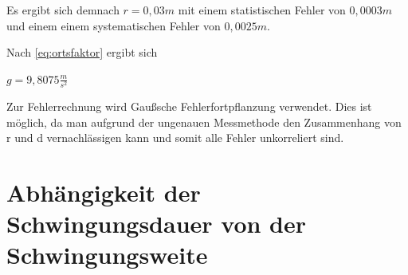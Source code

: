 Es ergibt sich demnach $r = 0,03m$ mit einem statistischen Fehler von $0,0003m$ und einem einem systematischen Fehler von $0,0025m$.

Nach \ref{eq:ortsfaktor} ergibt sich

$g = 9,8075\frac{m}{s^2}$

Zur Fehlerrechnung wird Gaußsche Fehlerfortpflanzung verwendet. Dies ist möglich, da man aufgrund der ungenauen Messmethode den Zusammenhang von r und d vernachlässigen kann und somit alle Fehler unkorreliert sind.



\section{Abhängigkeit der Schwingungsdauer von der Schwingungsweite}